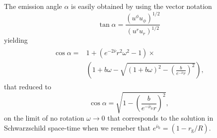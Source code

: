 \documentclass[iop, usenatbib]{emulateapj}
\newcommand{\be}{\begin{equation}}
\newcommand{\ee}{\end{equation}}
\newcommand{\rg}{\ensuremath{r_{\mathrm{g}}}}
\newcommand{\sch}{Schwarzschild }
\newcommand{\nub}{\ensuremath{\bar{\nu}}}
\begin{document}
The emission angle $\alpha$ is easily obtained by using the vector notation
\be
\tan \alpha = \frac{(u^{\phi}u_{\phi})^{1/2}}{(u^ru_r)^{1/2}}
\ee
yielding
\begin{align}\begin{split}
\cos \alpha = & 1 + (e^{-2\nub}r^2\omega^2 -1) \times \\
            & \left( 1+b\omega - \sqrt{(1+b\omega)^2 - \left(\frac{b}{e^{-\nub}r}\right)^2} \right),
\end{split}\end{align}
that reduced to 
\be
\cos \alpha = \sqrt{1-\left( \frac{b}{e^{-\nub_0}r} \right)^2},
\ee
on the limit of no rotation $\omega \rightarrow 0$ that corresponds to the solution in \sch space-time when we remeber that $e^{\nub_0} = (1-\rg/R)$.
\end{document}
